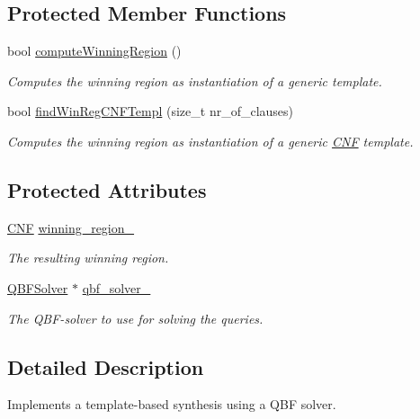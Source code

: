 \subsection*{Protected Member Functions}
\begin{DoxyCompactItemize}
\item 
bool \hyperlink{classTemplateSynth_ae334e4a6c30a324cfd4d0c05a32b191c}{compute\-Winning\-Region} ()
\begin{DoxyCompactList}\small\item\em Computes the winning region as instantiation of a generic template. \end{DoxyCompactList}\item 
bool \hyperlink{classTemplateSynth_a499d1c0069b41ce11a6c7e7679fd4ece}{find\-Win\-Reg\-C\-N\-F\-Templ} (size\-\_\-t nr\-\_\-of\-\_\-clauses)
\begin{DoxyCompactList}\small\item\em Computes the winning region as instantiation of a generic \hyperlink{classCNF}{C\-N\-F} template. \end{DoxyCompactList}\end{DoxyCompactItemize}
\subsection*{Protected Attributes}
\begin{DoxyCompactItemize}
\item 
\hyperlink{classCNF}{C\-N\-F} \hyperlink{classTemplateSynth_a4e147629eae6a542dd87d72902df68c8}{winning\-\_\-region\-\_\-}
\begin{DoxyCompactList}\small\item\em The resulting winning region. \end{DoxyCompactList}\item 
\hyperlink{classQBFSolver}{Q\-B\-F\-Solver} $\ast$ \hyperlink{classTemplateSynth_a08ec20197bf16a10546a7e6cf3719727}{qbf\-\_\-solver\-\_\-}
\begin{DoxyCompactList}\small\item\em The Q\-B\-F-\/solver to use for solving the queries. \end{DoxyCompactList}\end{DoxyCompactItemize}


\subsection{Detailed Description}
Implements a template-\/based synthesis using a Q\-B\-F solver. 

